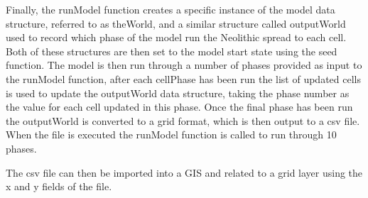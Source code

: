 Finally, the runModel function creates a specific instance of the model data structure, referred to as theWorld, and a similar structure called outputWorld used to record which phase of the model run the Neolithic spread to each cell. Both of these structures are then set to the model start state using the seed function. The model is then run through a number of phases provided as input to the runModel function, after each cellPhase has been run the list of updated cells is used to update the outputWorld data structure, taking the phase number as the value for each cell updated in this phase. Once the final phase has been run the outputWorld is converted to a grid format, which is then output to a csv file. When the file is executed the runModel function is called to run through 10 phases.

The csv file can then be imported into a GIS and related to a grid layer using the x and y fields of the file. 